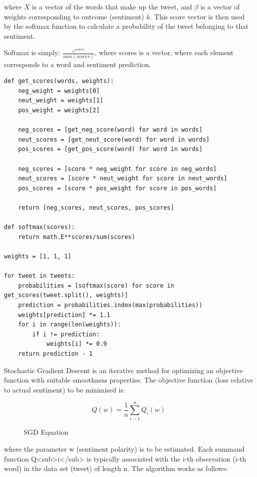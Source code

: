 \documentclass{article}
\begin{document}
where $X$ is a vector of the words that make up the tweet, and $\beta$ is a vector of weights corresponding to outcome (sentiment) $k$.
This score vector is then used by the softmax function to calculate a probability of the tweet belonging to that sentiment\autocite[8]{lr}.

Softmax is simply: $\frac{e^{scores}}{sum(scores)}$, where scores is a vector, where each element corresponds to a word and sentiment prediction.

\begin{lstlisting}[caption={Multinomial Logistic Regression classifier psuedopythoncode},captionpos=b]
def get_scores(words, weights):
	neg_weight = weights[0]
	neut_weight = weights[1]
	pos_weight = weights[2]

	neg_scores = [get_neg_score(word) for word in words]
	neut_scores = [get_neut_score(word) for word in words]
	pos_scores = [get_pos_score(word) for word in words]

	neg_scores = [score * neg_weight for score in neg_words]
	neut_scores = [score * neut_weight for score in neut_words]
	pos_scores = [score * pos_weight for score in pos_words]

	return [neg_scores, neut_scores, pos_scores]

def softmax(scores):
	return math.E**scores/sum(scores)

weights = [1, 1, 1]

for tweet in tweets:
	probabilities = [softmax(score) for score in get_scores(tweet.split(), weights)]
	prediction = probabilities.index(max(probabilities))
	weights[prediction] *= 1.1
	for i in range(len(weights)):
		if i != prediction:
			weights[i] *= 0.9
	return prediction - 1
\end{lstlisting}

Stochastic Gradient Descent is an iterative method for optimizing an objective function with suitable smoothness properties.
The objective function (loss relative to actual sentiment) to be minimised is:

\begin{figure}[H]
	\begin{equation}
		Q(w) = \frac{1}{n}\sum_{i-1}^{n}Q_i(w)
	\end{equation}
	\caption{SGD Equation}
\end{figure}

where the parameter w (sentiment polarity) is to be estimated.
Each summand function Q<sub>i</sub> is typically associated with the i-th observation (i-th word) in the data set (tweet) of length n\autocite[9]{sgd}.
The algorithm works as follows:
\end{document}
